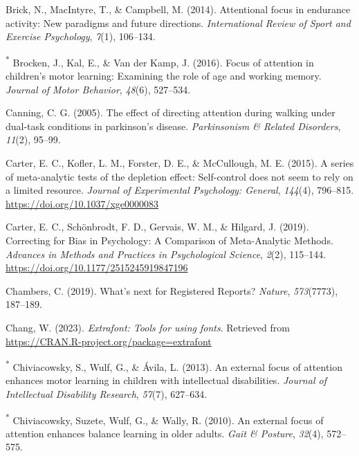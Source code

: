 \documentclass[
  man, donotrepeattitle,floatsintext]{apa7}
\newlength{\cslhangindent}
\newlength{\cslentryspacingunit} %
\newenvironment{CSLReferences}[2] %
 {%
  \setlength{\parindent}{0pt}
  \ifodd #1
  \let\oldpar\par
  \def\par{\hangindent=\cslhangindent\oldpar}
  \fi
  \setlength{\parskip}{#2\cslentryspacingunit}
 }%
 {}
\begin{document}
\begin{CSLReferences}{1}{0}
\leavevmode{}%
Brick, N., MacIntyre, T., \& Campbell, M. (2014). Attentional focus in endurance activity: New paradigms and future directions. \emph{International Review of Sport and Exercise Psychology}, \emph{7}(1), 106--134.

\leavevmode{}%
\textsuperscript{*} Brocken, J., Kal, E., \& Van der Kamp, J. (2016). Focus of attention in children's motor learning: Examining the role of age and working memory. \emph{Journal of Motor Behavior}, \emph{48}(6), 527--534.

\leavevmode{}%
Canning, C. G. (2005). The effect of directing attention during walking under dual-task conditions in parkinson's disease. \emph{Parkinsonism \& Related Disorders}, \emph{11}(2), 95--99.

\leavevmode{}%
Carter, E. C., Kofler, L. M., Forster, D. E., \& McCullough, M. E. (2015). A series of meta-analytic tests of the depletion effect: {Self-control} does not seem to rely on a limited resource. \emph{Journal of Experimental Psychology: General}, \emph{144}(4), 796--815. \url{https://doi.org/10.1037/xge0000083}

\leavevmode{}%
Carter, E. C., Schönbrodt, F. D., Gervais, W. M., \& Hilgard, J. (2019). Correcting for {Bias} in {Psychology}: {A Comparison} of {Meta-Analytic Methods}. \emph{Advances in Methods and Practices in Psychological Science}, \emph{2}(2), 115--144. \url{https://doi.org/10.1177/2515245919847196}

\leavevmode{}%
Chambers, C. (2019). What's next for {Registered Reports}? \emph{Nature}, \emph{573}(7773), 187--189.

\leavevmode{}%
Chang, W. (2023). \emph{Extrafont: Tools for using fonts}. Retrieved from \url{https://CRAN.R-project.org/package=extrafont}

\leavevmode{}%
\textsuperscript{*} Chiviacowsky, S., Wulf, G., \& Ávila, L. (2013). An external focus of attention enhances motor learning in children with intellectual disabilities. \emph{Journal of Intellectual Disability Research}, \emph{57}(7), 627--634.

\leavevmode{}%
\textsuperscript{*} Chiviacowsky, Suzete, Wulf, G., \& Wally, R. (2010). An external focus of attention enhances balance learning in older adults. \emph{Gait \& Posture}, \emph{32}(4), 572--575.


\end{CSLReferences}
\end{document}
